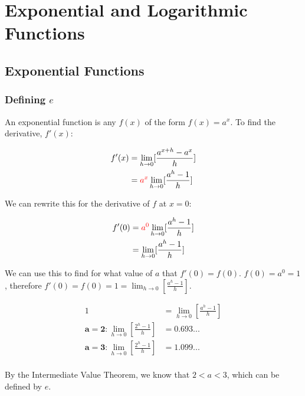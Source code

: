 \documentclass[12pt]{article}
\begin{document}
\section{Exponential and Logarithmic Functions}
\subsection{Exponential Functions}
\subsubsection{Defining \texorpdfstring{$e$}{Euler's number}}

An exponential function is any $f(x)$ of the form $f(x) = a^x$. To find the derivative, $f'(x)$:

\begin{equation}
    \begin{split}
        f'(x) &= \lim_{h\to 0} [\frac{a^{x+h}-a^x}{h}]\\
        &=\textcolor{red}{a^x}\lim_{h\to 0}[\frac{a^h-1}{h}]\\
    \end{split}
\end{equation}

We can rewrite this for the derivative of $f$ at $x = 0$:

\begin{equation}\label{eqn:expderiv}
    \begin{split}
    f'(0) &= \textcolor{red}{a^0}\lim_{h\to 0}[\frac{a^h-1}{h}]\\
    &=\lim_{h\to 0}[\frac{a^h-1}{h}]
    \end{split}
\end{equation}

We can use this to find for what value of $a$ that $f'(0) = f(0)$. $f(0) = a^0 = 1$, therefore $f'(0) = f(0) = 1 = \lim_{h\to 0}[\frac{a^h-1}{h}]$.

\begin{equation}
    \begin{split}
        1 &= \lim_{h\to 0}[\frac{a^h-1}{h}]\\
        \mathbf{a = 2:} \lim_{h\to 0}[\frac{2^h-1}{h}] &= 0.693...\\
        \mathbf{a = 3:} \lim_{h\to 0}[\frac{2^h-1}{h}] &= 1.099...\\
    \end{split}
\end{equation}

By the Intermediate Value Theorem, we know that $2 < a < 3$, which can be defined by $e$.
\end{document}
